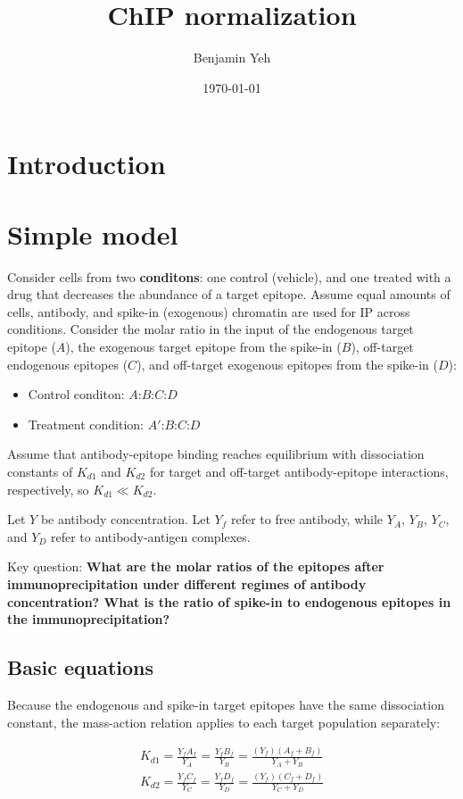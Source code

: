 \documentclass[11pt]{article}
\title{ChIP normalization}
\author{Benjamin Yeh}
\date{\today}
\begin{document}
\maketitle

\section{Introduction}

\section{Simple model}

Consider cells from two \textbf{conditons}: one control (vehicle), and one treated with a drug that decreases the abundance of a target epitope. Assume equal amounts of cells, antibody, and spike-in (exogenous) chromatin are used for IP across conditions. Consider the molar ratio in the input of the endogenous target epitope ($A$), the exogenous target epitope from the spike-in ($B$), off-target endogenous epitopes ($C$), and off-target exogenous epitopes from the spike-in ($D$):
\begin{itemize}
\item Control conditon: $A$:$B$:$C$:$D$
\item Treatment condition: $A'$:$B$:$C$:$D$
\end{itemize}

Assume that antibody-epitope binding reaches equilibrium with dissociation constants of $K_{d1}$ and $K_{d2}$ for target and off-target antibody-epitope interactions, respectively, so $K_{d1} \ll K_{d2}$.

Let $Y$ be antibody concentration. Let $Y_f$ refer to free antibody, while $Y_A$, $Y_B$, $Y_C$, and $Y_D$ refer to antibody-antigen complexes.

Key question: \textbf{What are the molar ratios of the epitopes after immunoprecipitation under different regimes of antibody concentration? What is the ratio of spike-in to endogenous epitopes in the immunoprecipitation?}

\subsection{Basic equations}

Because the endogenous and spike-in target epitopes have the same dissociation constant, the mass-action relation applies to each target population separately:

$$
\begin{gathered}
K_{d1}
= \frac{Y_f A_f}{Y_A}
= \frac{Y_f B_f}{Y_B}
= \frac{(Y_f) (A_f + B_f)}{Y_A + Y_B} \\
K_{d2}
= \frac{Y_f C_f}{Y_C}
= \frac{Y_f D_f}{Y_D}
= \frac{(Y_f) (C_f + D_f)}{Y_C + Y_D}
\end{gathered}
$$
\end{document}
